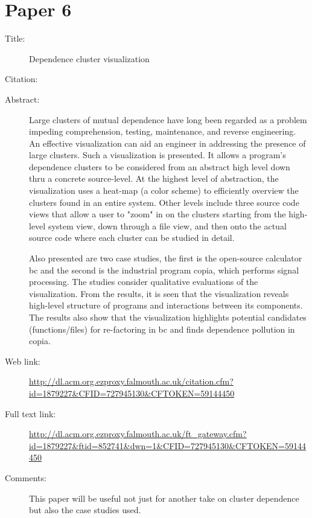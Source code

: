 \documentclass{scrartcl}
\begin{document}
\section*{Paper 6}
\begin{description}
\item[Title:] Dependence cluster visualization
\item[Citation:] \cite{islam2010dependence}
\item[Abstract:]Large clusters of mutual dependence have long been regarded as a problem impeding comprehension, testing, maintenance, and reverse engineering. An effective visualization can aid an engineer in addressing the presence of large clusters. Such a visualization is presented. It allows a program's dependence clusters to be considered from an abstract high level down thru a concrete source-level. At the highest level of abstraction, the visualization uses a heat-map (a color scheme) to efficiently overview the clusters found in an entire system. Other levels include three source code views that allow a user to "zoom" in on the clusters starting from the high-level system view, down through a file view, and then onto the actual source code where each cluster can be studied in detail.

Also presented are two case studies, the first is the open-source calculator bc and the second is the industrial program copia, which performs signal processing. The studies consider qualitative evaluations of the visualization. From the results, it is seen that the visualization reveals high-level structure of programs and interactions between its components. The results also show that the visualization highlights potential candidates (functions/files) for re-factoring in bc and finds dependence pollution in copia.
\item[Web link:] \url {http://dl.acm.org.ezproxy.falmouth.ac.uk/citation.cfm?id=1879227&CFID=727945130&CFTOKEN=59144450}
\item[Full text link:]\url { http://dl.acm.org.ezproxy.falmouth.ac.uk/ft_gateway.cfm?id=1879227&ftid=852741&dwn=1&CFID=727945130&CFTOKEN=59144450}
\item[Comments:] This paper will be useful not just for another take on cluster dependence but also the case studies used.
\end{description}
\end{document}
